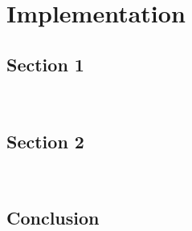 

\chapter{Implementation}
\label{chap:implementation}

\lipsum[18]

\minitoc
\newpage

\section{Section 1}

\lipsum[19] \\ \lipsum[20]

\section{Section 2}

\lipsum[21] \\ \lipsum[22]


\section{Conclusion}

\lipsum[23]
